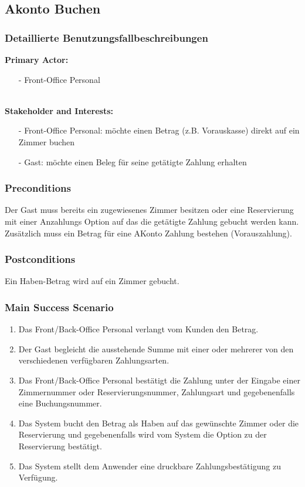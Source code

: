 \documentclass[./detailed_overview_usecases.tex]{subfiles}
\begin{document}
    \newpage
    \subsection{Akonto Buchen}
    \subsubsection{Detaillierte Benutzungsfallbeschreibungen}
    \textbf{Primary Actor:}
    \begin{itemize}
        \item[-] Front-Office Personal
    \end{itemize}
    \\
    \textbf{Stakeholder and Interests:}
    \begin{itemize}
        \item[-] Front-Office Personal: möchte einen Betrag (z.B. Vorauskasse) direkt auf ein Zimmer buchen
        \item[-] Gast: möchte einen Beleg für seine getätigte Zahlung erhalten
    \end{itemize}

    \subsubsection*{Preconditions}
    Der Gast muss bereits ein zugewiesenes Zimmer besitzen oder eine Reservierung mit einer Anzahlungs Option auf das die getätigte Zahlung gebucht werden kann.
    Zusätzlich muss ein Betrag für eine AKonto Zahlung bestehen (Vorauszahlung).

    \subsubsection*{Postconditions}
    Ein Haben-Betrag wird auf ein Zimmer gebucht.

    \subsubsection*{Main Success Scenario}
    \begin{enumerate}
        \item Das Front/Back-Office Personal verlangt vom Kunden den Betrag.
        \item Der Gast begleicht die ausstehende Summe mit einer oder mehrerer von den verschiedenen verfügbaren Zahlungsarten.
        \item Das Front/Back-Office Personal bestätigt die Zahlung unter der Eingabe einer
        Zimmernummer oder Reservierungsnummer, Zahlungsart und gegebenenfalls eine Buchungsnummer.
        \item Das System bucht den Betrag als Haben auf das gewünschte Zimmer oder die Reservierung und gegebenenfalls wird vom System die Option zu der Reservierung bestätigt.
        \item Das System stellt dem Anwender eine druckbare Zahlungsbestätigung zu Verfügung.
    \end{enumerate}
\end{document}
